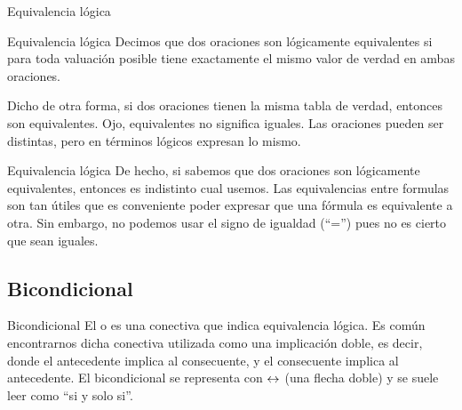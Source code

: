
\begin{frame}{Equivalencia lógica}
  \begin{block}{Equivalencia lógica}
    Decimos que dos oraciones son lógicamente equivalentes si para toda valuación
    posible tiene exactamente el mismo valor de verdad en ambas oraciones.
  \end{block}
  \jump
  Dicho de otra forma, si dos oraciones tienen la misma tabla de verdad, entonces
  son equivalentes.
  \jump
  Ojo, equivalentes no significa iguales. Las oraciones pueden ser distintas,
  pero en términos lógicos expresan lo mismo.
\end{frame}


\begin{frame}{Equivalencia lógica}
  De hecho, si sabemos que dos oraciones son lógicamente equivalentes, entonces
  es indistinto cual usemos.
  \jump
  Las equivalencias entre formulas son tan útiles que es conveniente poder
  expresar que una fórmula es equivalente a otra.
  \jump
  Sin embargo, no podemos usar el signo de igualdad (``='') pues no es cierto
  que sean iguales.
\end{frame}


\subsection{Bicondicional}


\begin{frame}{Bicondicional}
  El  o  es una conectiva que
  indica equivalencia lógica.
  \jump
  Es común encontrarnos dicha conectiva utilizada como una implicación doble,
  es decir, donde el antecedente implica al consecuente, y el consecuente implica
  al antecedente.
  \jump
  El bicondicional se representa con $\leftrightarrow$ (una flecha doble) y se suele leer
  como ``si y solo si''.
\end{frame}


